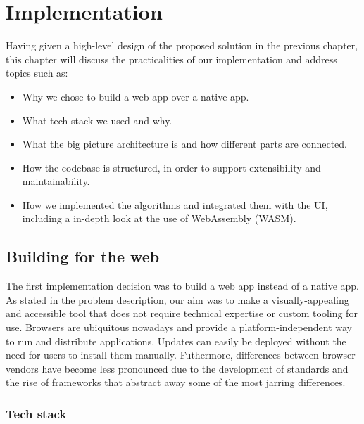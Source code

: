 \documentclass{l4proj}
\begin{document}
\chapter{Implementation}
Having given a high-level design of the proposed solution in the previous chapter, this chapter will discuss the practicalities of our implementation and address topics such as:
\begin{itemize}
    \item Why we chose to build a web app over a native app.
    \item What tech stack we used and why.
    \item What the big picture architecture is and how different parts are connected.
    \item How the codebase is structured, in order to support extensibility and maintainability.
    \item How we implemented the algorithms and integrated them with the UI, including a in-depth look at the use of WebAssembly (WASM).
\end{itemize}

\section{Building for the web}
The first implementation decision was to build a web app instead of a native app. As stated in the problem description, our aim was to make a visually-appealing and accessible tool that does not require technical expertise or custom tooling for use. Browsers are ubiquitous nowadays and provide a platform-independent way to run and distribute applications. Updates can easily be deployed without the need for users to install them manually.
Futhermore, differences between browser vendors have become less pronounced due to the development of standards and the rise of frameworks that abstract away some of the most jarring differences.


\subsection{Tech stack}
\end{document}
